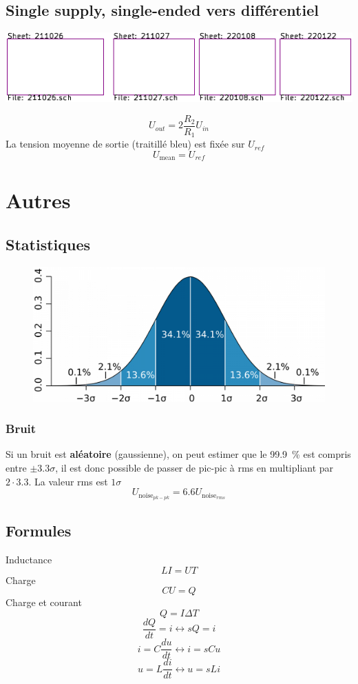 \documentclass[resume]{subfiles}
\begin{document}
\begin{multicols}{3}
\subsection{Single supply, single-ended vers différentiel}
\begin{center}
\includegraphics[scale=1,page=18]{../KiCad/resume-crop.pdf}
\end{center}
$$\boxed{U_{out}=2\frac{R_2}{R_1}U_{in}}$$
La tension moyenne de sortie (traitillé bleu) est fixée sur $U_{ref}$
$$\boxed{U_{\text{mean}}=U_{ref}}$$


\section{Autres}
\subsection{Statistiques}
\begin{figure}[H]
\centering
\includegraphics[width=0.6\columnwidth]{gauss.png}
\end{figure}
\subsubsection{Bruit}
Si un bruit est \textbf{aléatoire} (gaussienne), on peut estimer que le \SI{99.9}{\percent} est compris entre $\pm 3.3\sigma$, il est donc possible de passer de pic-pic à rms en multipliant par $2\cdot 3.3$. La valeur rms est $1\sigma$
$$U_{\text{noise}_{pk-pk}}=6.6 U_{\text{noise}_{rms}}$$
\columnbreak
\subsection{Formules}
Inductance
$$LI=UT$$
Charge
$$CU=Q$$
Charge et courant
$$Q=I\Delta T$$
$$\frac{dQ}{dt}=i\longleftrightarrow sQ=i$$
$$i=C\frac{du}{dt}\longleftrightarrow i=sCu$$
$$u=L\frac{di}{dt}\longleftrightarrow u=sLi$$





\end{multicols}
\end{document}
